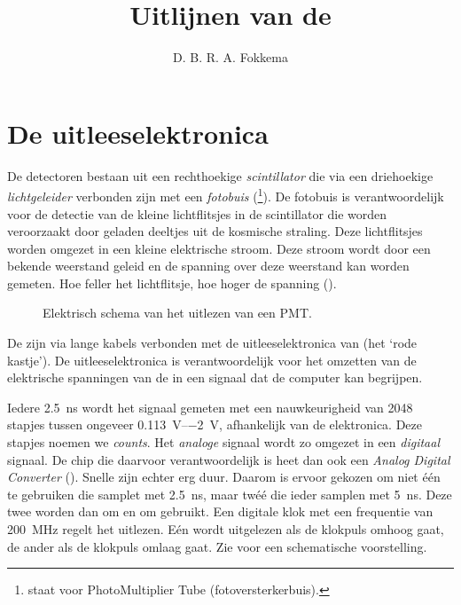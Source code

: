 



\title{Uitlijnen van de \adcs}
\author{D. B. R. A. Fokkema}
\date{}

\maketitle

\section{De \hisparc uitleeselektronica}

De \hisparc detectoren bestaan uit een rechthoekige \emph{scintillator}
die via een driehoekige \emph{lichtgeleider} verbonden zijn met een
\emph{fotobuis} (\pmt \footnote{\pmt staat voor PhotoMultiplier Tube
(fotoversterkerbuis).}).  De fotobuis is verantwoordelijk voor de detectie
van de kleine lichtflitsjes in de scintillator die worden veroorzaakt door
geladen deeltjes uit de kosmische straling.  Deze lichtflitsjes worden
omgezet in een kleine elektrische stroom.  Deze stroom wordt door een
bekende weerstand geleid en de spanning over deze weerstand kan worden
gemeten.  Hoe feller het lichtflitsje, hoe hoger de spanning
().

\begin{figure}
\centering
{}
\caption{Elektrisch schema van het uitlezen van een PMT.}
\label{fig:schema-pmt}
\end{figure}

De \pmts zijn via lange kabels verbonden met de uitleeselektronica van
\hisparc (het `rode kastje').  De uitleeselektronica is verantwoordelijk
voor het omzetten van de elektrische spanningen van de \pmts in een
signaal dat de computer kan begrijpen.

Iedere \SI{2.5}{\nano\second} wordt het signaal gemeten met een
nauwkeurigheid van \num{2048} stapjes tussen ongeveer
\SIrange{+0.113}{-2}{\volt}, afhankelijk van de elektronica.  Deze stapjes
noemen we \emph{\adc counts}.  Het \emph{analoge} signaal wordt zo omgezet
in een \emph{digitaal} signaal.  De chip die daarvoor verantwoordelijk is
heet dan ook een \emph{Analog Digital Converter} (\adc).  Snelle \adcs
zijn echter erg duur.  Daarom is ervoor gekozen om niet één \adc te
gebruiken die samplet met \SI{2.5}{\nano\second}, maar twéé \adcs die
ieder samplen met \SI{5}{\nano\second}.  Deze twee \adcs worden dan om en
om gebruikt.  Een digitale klok met een frequentie van
\SI{200}{\mega\hertz} regelt het uitlezen.  Eén \adc wordt uitgelezen als
de klokpuls omhoog gaat, de ander als de klokpuls omlaag gaat.  Zie
 voor een schematische voorstelling.

